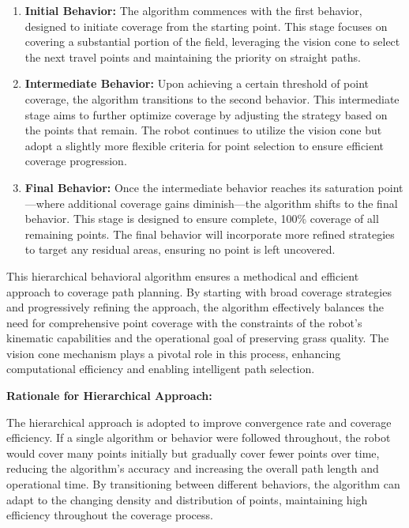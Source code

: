 \begin{enumerate}
    \item \textbf{Initial Behavior: }The algorithm commences with the first behavior, designed to initiate coverage from the starting point. This stage focuses on covering a substantial portion of the field, leveraging the vision cone to select the next travel points and maintaining the priority on straight paths.
    
    \item \textbf{Intermediate Behavior:} Upon achieving a certain threshold of point coverage, the algorithm transitions to the second behavior. This intermediate stage aims to further optimize coverage by adjusting the strategy based on the points that remain. The robot continues to utilize the vision cone but adopt a slightly more flexible criteria for point selection to ensure efficient coverage progression.
    
    \item \textbf{Final Behavior:} Once the intermediate behavior reaches its saturation point—where additional coverage gains diminish—the algorithm shifts to the final behavior. This stage is designed to ensure complete, 100\% coverage of all remaining points. The final behavior will incorporate more refined strategies to target any residual areas, ensuring no point is left uncovered.
\end{enumerate}

\vspace*{6mm}   


This hierarchical behavioral algorithm ensures a methodical and efficient approach to coverage path planning. By starting with broad coverage strategies and progressively refining the approach, the algorithm effectively balances the need for comprehensive point coverage with the constraints of the robot's kinematic capabilities and the operational goal of preserving grass quality. The vision cone mechanism plays a pivotal role in this process, enhancing computational efficiency and enabling intelligent path selection. 

\vspace*{6mm}   


\textbf{Rationale for Hierarchical Approach: } 

\vspace*{6mm}   


The hierarchical approach is adopted to improve convergence rate and coverage efficiency. If a single algorithm or behavior were followed throughout, the robot would cover many points initially but gradually cover fewer points over time, reducing the algorithm's accuracy and increasing the overall path length and operational time. By transitioning between different behaviors, the algorithm can adapt to the changing density and distribution of points, maintaining high efficiency throughout the coverage process.

